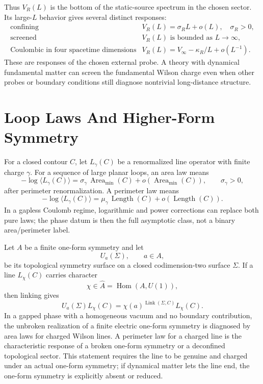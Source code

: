 Thus \(V_R(L)\) is the bottom of the static-source spectrum in the chosen
sector.  Its large-\(L\) behavior gives several distinct responses:
\[
\begin{array}{ll}
  \text{confining} &
  V_R(L)=\sigma_R L+o(L),\quad \sigma_R>0,\\[1mm]
  \text{screened} &
  V_R(L)\text{ is bounded as }L\to\infty,\\[1mm]
  \text{Coulombic in four spacetime dimensions} &
  V_R(L)=V_\infty-\kappa_R/L+o(L^{-1}).
\end{array}
\]
These are responses of the chosen external probe.  A theory with dynamical
fundamental matter can screen the fundamental Wilson charge even when other
probes or boundary conditions still diagnose nontrivial long-distance
structure.

\section{Loop Laws And Higher-Form Symmetry}

For a closed contour \(C\), let \(L_\gamma(C)\) be a renormalized line
operator with finite charge \(\gamma\).  For a sequence of large planar loops,
an area law means
\[
  -\log\langle L_\gamma(C)\rangle
  =
  \sigma_\gamma\,\operatorname{Area}_{\min}(C)
  +o(\operatorname{Area}_{\min}(C)),
  \qquad \sigma_\gamma>0,
\]
after perimeter renormalization.  A perimeter law means
\[
  -\log\langle L_\gamma(C)\rangle
  =
  \mu_\gamma\,\operatorname{Length}(C)
  +o(\operatorname{Length}(C)).
\]
In a gapless Coulomb regime, logarithmic and power corrections can replace
both pure laws; the phase datum is then the full asymptotic class, not a
binary area/perimeter label.

Let \(A\) be a finite one-form symmetry and let
\[
  U_a(\Sigma),\qquad a\in A,
\]
be its topological symmetry surface on a closed codimension-two surface
\(\Sigma\).  If a line \(L_\chi(C)\) carries character
\[
  \chi\in \widehat A=\operatorname{Hom}(A,U(1)),
\]
then linking gives
\[
  U_a(\Sigma)L_\chi(C)
  =
  \chi(a)^{\operatorname{Link}(\Sigma,C)}
  L_\chi(C).
\]
In a gapped phase with a homogeneous vacuum and no boundary contribution, the
unbroken realization of a finite electric one-form symmetry is diagnosed by
area laws for charged Wilson lines.  A perimeter law for a charged line is
the characteristic response of a broken one-form symmetry or a deconfined
topological sector.  This statement requires the line to be genuine and
charged under an actual one-form symmetry; if dynamical matter lets the line
end, the one-form symmetry is explicitly absent or reduced.

